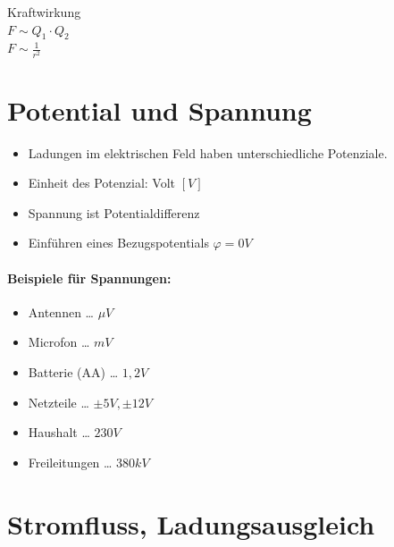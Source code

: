 Kraftwirkung\\
$F \sim Q_1 \cdot Q_2$\\
$F \sim \frac{1}{r^2}$\\

\section{Potential und Spannung}

\begin{itemize}
\item Ladungen im elektrischen Feld haben unterschiedliche Potenziale.
\item Einheit des Potenzial: Volt $[V]$
\item Spannung ist Potentialdifferenz
\item Einführen eines Bezugspotentials $\varphi = 0 V$
\end{itemize}

\paragraph{Beispiele für Spannungen:}
\begin{itemize}
\item Antennen … $\mu V$
\item Microfon … $m V $
\item Batterie (AA) … $1,2 V $
\item Netzteile … $\pm 5 V, \pm 12 V$
\item Haushalt … $230V$
\item Freileitungen … $380 kV$
\end{itemize}

\section{Stromfluss, Ladungsausgleich}

